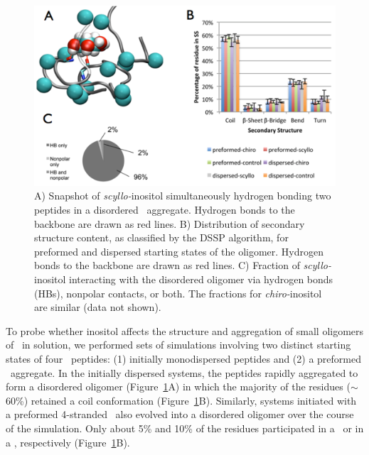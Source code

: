 \begin{figure}[htbp]
  \centering
  \includegraphics[width=6in]{figures/results1/GA4_paper_figures_submitted-4-rearranged}
  \caption[Binding of \textit{scyllo-}inositol to the disordered oligomer of \gafour.]{A) Snapshot of \textit{scyllo-}inositol simultaneously hydrogen bonding two peptides in a disordered \gafour\ aggregate. Hydrogen bonds to the backbone are drawn as red lines. B) Distribution of secondary structure content, as classified by the DSSP algorithm, for preformed and dispersed starting states of the oligomer. Hydrogen bonds to the backbone are drawn as red lines. C) Fraction of \textit{scyllo-}inositol interacting with the disordered oligomer via hydrogen bonds (HBs), nonpolar contacts, or both. The fractions for \textit{chiro-}inositol are similar (data not shown).}
   \label{fig:figure4}
\end{figure}

To probe whether inositol affects the structure and aggregation of small oligomers of \gafour\ in solution, we performed sets of simulations involving two distinct starting states of four \gafour\ peptides: (1) initially monodispersed peptides and (2) a preformed \bsheet\ aggregate. In the initially dispersed systems, the peptides rapidly aggregated to form a disordered oligomer (Figure~\ref{fig:figure4}A) in which the majority of the residues ($\sim$60\%) retained a coil conformation (Figure~\ref{fig:figure4}B). Similarly, systems initiated with a preformed 4-stranded \bsheet\ also evolved into a disordered oligomer over the course of the simulation. Only about 5\% and 10\% of the residues participated in a \bsheet\ or in a \bbridge, respectively (Figure~\ref{fig:figure4}B).
	
